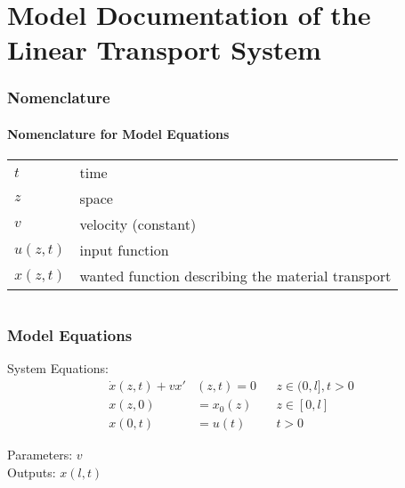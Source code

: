 \documentclass[10pt,a4paper]{article}
\begin{document}
	\part*{Model Documentation of the Linear Transport System} %
	
	
	\section{Nomenclature} %
	\subsection{Nomenclature for Model Equations} %
	
	\begin{tabular}{ll}
		$t$ & time \\
		$z$ & space \\
		$v$ & velocity (constant) \\
		$u(z, t)$ & input function \\
		$x(z, t)$ & wanted function describing the material transport
				
	\end{tabular}
	 
	
	\begin{tabular}{ll}

	\end{tabular}
	
	
	\section{Model Equations} %
	
	\noindent System Equations:			
	\begin{subequations}
	\begin{align*}
		\dot{x}(z,t) + v x'&(z,t) = 0 && z\in (0, l], t>0\\
		x(z,0) &= x_0(z) && z\in [0,l]\\
		x(0,t) &= u(t) && t>0
	\end{align*}
	\end{subequations}

	\noindent
	Parameters: $v$ %
	\\
	Outputs: $x(l,t)$
	
\end{document}
